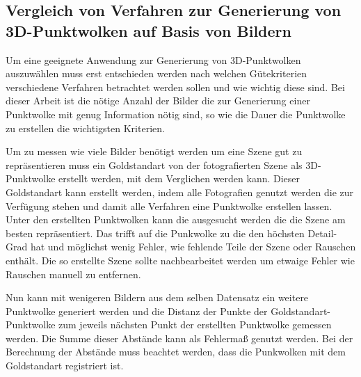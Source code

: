 \documentclass[12pt,titlepage, twoside]{article}
\begin{document}
\subsection{Vergleich von Verfahren zur Generierung von 3D-Punktwolken auf Basis von Bildern}

Um eine geeignete Anwendung zur Generierung von 3D-Punktwolken auszuwählen muss erst entschieden werden nach welchen Gütekriterien verschiedene Verfahren betrachtet werden sollen und wie wichtig diese sind.
Bei dieser Arbeit ist die nötige Anzahl der Bilder die zur Generierung einer Punktwolke mit genug Information nötig sind, so wie die Dauer die Punktwolke zu erstellen die wichtigsten Kriterien.

Um zu messen wie viele Bilder benötigt werden um eine Szene gut zu repräsentieren muss ein Goldstandart von der fotografierten Szene als 3D-Punktwolke erstellt werden, mit dem Verglichen werden kann.
Dieser Goldstandart kann erstellt werden, indem alle Fotografien genutzt werden die zur Verfügung stehen und damit alle Verfahren eine Punktwolke erstellen lassen. 
Unter den erstellten Punktwolken kann die ausgesucht werden die die Szene am besten repräsentiert. 
Das trifft auf die Punkwolke zu die den höchsten Detail-Grad hat und möglichst wenig Fehler, wie fehlende Teile der Szene oder Rauschen enthält.
Die so erstellte Szene sollte nachbearbeitet werden um etwaige Fehler wie Rauschen manuell zu entfernen.

Nun kann mit wenigeren Bildern aus dem selben Datensatz ein weitere Punktwolke generiert werden und die Distanz der Punkte der Goldstandart-Punktwolke zum jeweils nächsten Punkt der erstellten Punktwolke gemessen werden.
Die Summe dieser Abstände kann als Fehlermaß genutzt werden. Bei der Berechnung der Abstände muss beachtet werden, dass die Punkwolken mit dem Goldstandart registriert ist.
\end{document}
